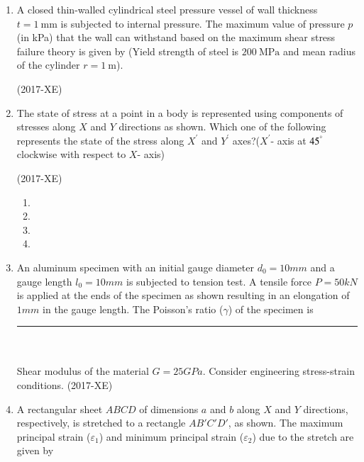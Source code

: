 \documentclass[journal]{IEEEtran}
\begin{document}
\begin{enumerate}

\begin{enumerate}
\end{enumerate}
\item A closed thin-walled cylindrical steel pressure vessel of wall thickness $t = 1 \ \text{mm}$ is subjected to internal pressure. The maximum value of pressure $p$ (in kPa) that the wall can withstand based on the maximum shear stress failure theory is given by (Yield strength of steel is $200 \ \text{MPa}$ and mean radius of the cylinder $r = 1 \ \text{m}$).

\hfill(2017-XE)
\begin{enumerate}
\end{enumerate}
\item The state of stress at a point in a body is represented using components of stresses along $X$ and $Y$ directions as shown. Which one of the following represents the state of the stress along $X^\prime$ and $Y^\prime$ axes?($X^\prime$- axis at $45^\degree$ clockwise with respect to $X$- axis)

\hfill(2017-XE)

\begin{enumerate}
    \item 
    \item 
    \item 
    \item 
\end{enumerate}
\item An aluminum specimen with an initial gauge diameter $d_0 = 10mm$ and a gauge length $l_0 = 10mm$ is subjected to tension test. A tensile force $P = 50kN$ is applied at the ends of the specimen as shown resulting in an elongation of $1mm$ in the gauge length. The Poisson's ratio ($\gamma$) of the specimen is \rule{2cm}{0.4pt}\\ \\
Shear modulus of the material $G = 25GPa$. Consider engineering stress-strain conditions. \hfill(2017-XE)

\item A rectangular sheet $ABCD$ of dimensions $a$ and $b$ along $X$ and $Y$ directions, respectively, is stretched to a rectangle $AB'C'D'$, as shown. The maximum principal strain ($\varepsilon_1$) and minimum principal strain ($\varepsilon_2$) due to the stretch are given by


\end{enumerate}
\end{document}
